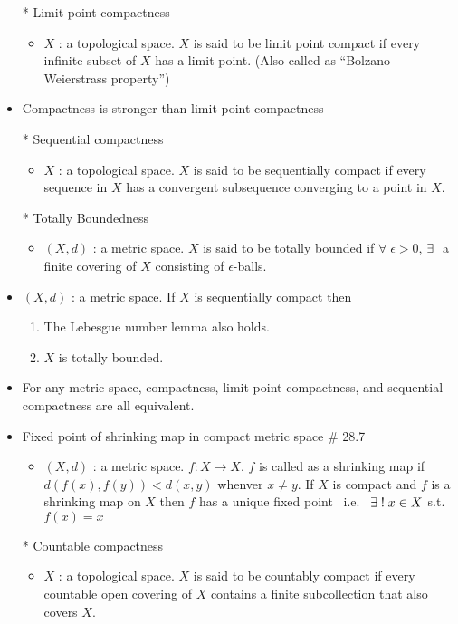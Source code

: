 \documentclass[12pt]{article}
\newcommand{\spone}{\hspace{0.1cm}}
\newcommand{\exist}{\exists\spone}
\begin{document}
\begin{itemize}
	\item[*] Limit point compactness
	\begin{itemize}
		\item $X$ : a topological space. $X$ is said to be limit point compact if every infinite subset of $X$ has a limit point. (Also called as ``Bolzano-Weierstrass property'')
	\end{itemize}
	\item Compactness is stronger than limit point compactness
	\item[*] Sequential compactness
	\begin{itemize}
		\item $X$ : a topological space. $X$ is said to be sequentially compact if every sequence in $X$ has a convergent subsequence converging to a point in $X$.
	\end{itemize}
	\item[*]Totally Boundedness
	\begin{itemize}
		\item $(X,d)$ : a metric space. $X$ is said to be totally bounded if $\forall \; \epsilon>0$, $\exist$ a finite covering of $X$ consisting of $\epsilon$-balls. 
	\end{itemize} 
	\item $(X,d)$ : a metric space. If $X$ is sequentially compact then 
	\begin{enumerate}
		\item The Lebesgue number lemma also holds.
		\item $X$ is totally bounded.
	\end{enumerate} 
	\item For any metric space, compactness, limit point compactness, and sequential compactness are all equivalent.
	\item Fixed point of shrinking map in compact metric space \quad \# 28.7
	\begin{itemize}
		\item $(X,d)$ : a metric space. $f: X\rightarrow X$. $f$ is called as a shrinking map if \\$d(f(x),f(y))<d(x,y)$ whenver $x\neq y$. If $X$ is compact and $f$ is a shrinking map on $X$ then $f$ has a unique fixed point \, i.e. \, $\exist ! \;x\in X$ s.t. $f(x)=x$
	\end{itemize}
	\item[*] Countable compactness
	\begin{itemize}
		\item $X$ : a topological space. $X$ is said to be countably compact if every countable open covering of $X$ contains a finite subcollection that also covers $X$.

\end{itemize}
\end{itemize}
\end{document}
